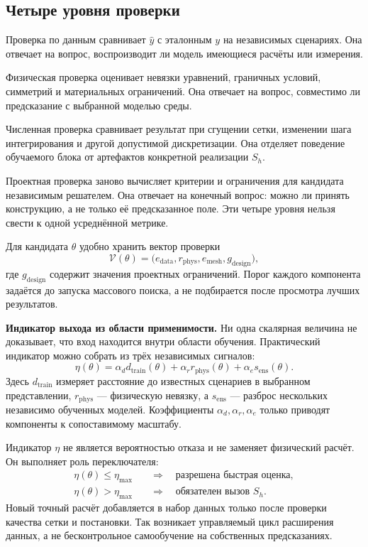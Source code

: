 \subsection{Четыре уровня проверки}
Проверка по данным сравнивает $\widehat y$ с эталонным $y$ на независимых сценариях. Она отвечает на вопрос, воспроизводит ли модель имеющиеся расчёты или измерения.

Физическая проверка оценивает невязки уравнений, граничных условий, симметрий и материальных ограничений. Она отвечает на вопрос, совместимо ли предсказание с выбранной моделью среды.

Численная проверка сравнивает результат при сгущении сетки, изменении шага интегрирования и другой допустимой дискретизации. Она отделяет поведение обучаемого блока от артефактов конкретной реализации $S_h$.

Проектная проверка заново вычисляет критерии и ограничения для кандидата независимым решателем. Она отвечает на конечный вопрос: можно ли принять конструкцию, а не только её предсказанное поле. Эти четыре уровня нельзя свести к одной усреднённой метрике.

Для кандидата $\theta$ удобно хранить вектор проверки
\begin{equation}
 \mathcal V(\theta)
 =
 \bigl(
  e_{\mathrm{data}},
  r_{\mathrm{phys}},
  e_{\mathrm{mesh}},
  g_{\mathrm{design}}
 \bigr),
\end{equation}
где $g_{\mathrm{design}}$ содержит значения проектных ограничений. Порог каждого компонента задаётся до запуска массового поиска, а не подбирается после просмотра лучших результатов.

\medskip
\noindent\textbf{Индикатор выхода из области применимости.}
Ни одна скалярная величина не доказывает, что вход находится внутри области обучения. Практический индикатор можно собрать из трёх независимых сигналов:
\begin{equation}
 \eta(\theta)
 =
 \alpha_d d_{\mathrm{train}}(\theta)
 +
 \alpha_r r_{\mathrm{phys}}(\theta)
 +
 \alpha_e s_{\mathrm{ens}}(\theta).
\end{equation}
Здесь $d_{\mathrm{train}}$ измеряет расстояние до известных сценариев в выбранном представлении, $r_{\mathrm{phys}}$ --- физическую невязку, а $s_{\mathrm{ens}}$ --- разброс нескольких независимо обученных моделей. Коэффициенты $\alpha_d,\alpha_r,\alpha_e$ только приводят компоненты к сопоставимому масштабу.

Индикатор $\eta$ не является вероятностью отказа и не заменяет физический расчёт. Он выполняет роль переключателя:
\begin{equation}
 \begin{aligned}
  \eta(\theta)\leq\eta_{\max}
  &\quad\Longrightarrow\quad
  \text{разрешена быстрая оценка},\\
  \eta(\theta)>\eta_{\max}
  &\quad\Longrightarrow\quad
  \text{обязателен вызов }S_h.
 \end{aligned}
\end{equation}
Новый точный расчёт добавляется в набор данных только после проверки качества сетки и постановки. Так возникает управляемый цикл расширения данных, а не бесконтрольное самообучение на собственных предсказаниях.

